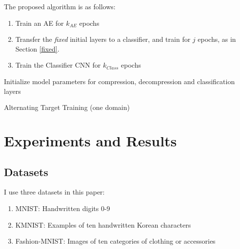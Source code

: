 \documentclass[twoside,11pt]{article}
\begin{document}
The proposed algorithm is as follows:

\begin{enumerate}
\item{Train an AE for $k_{AE}$ epochs}
\item{Transfer the \emph{fixed} initial layers to a classifier, and train for 
$j$ epochs, as in Section \ref{fixed}.}
\item{Train the Classifier CNN for $k_{Class}$ epochs}
\end{enumerate}

\begin{algorithm}[H]
\SetAlgoLined
{}
 Initialize model parameters for compression, decompression and classification layers
 \caption{Alternating Target Training (one domain)}
\end{algorithm}









\section{Experiments and Results}


\subsection{Datasets}

I use three datasets in this paper:

\begin{enumerate}
\item{MNIST: Handwritten digits 0-9}
\item{KMNIST: Examples of ten handwritten Korean characters}
\item{Fashion-MNIST: Images of ten categories of clothing or accessories}
\end{enumerate}
\end{document}
